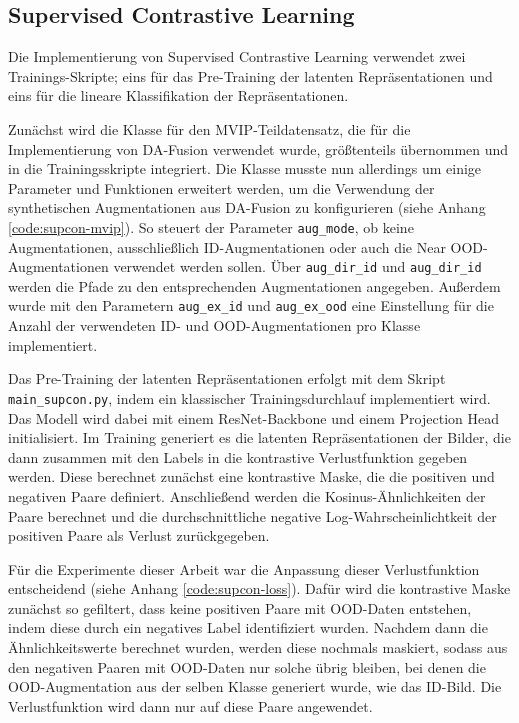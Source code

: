 \subsection{Supervised Contrastive Learning} \label{sec:supcon-implementation}

Die Implementierung von Supervised Contrastive Learning verwendet zwei Trainings-Skripte; eins für das Pre-Training der latenten Repräsentationen und eins für die lineare Klassifikation der Repräsentationen.

Zunächst wird die Klasse für den MVIP-Teildatensatz, die für die Implementierung von DA-Fusion verwendet wurde, größtenteils übernommen und in die Trainingsskripte integriert. Die Klasse musste nun allerdings um einige Parameter und Funktionen erweitert werden, um die Verwendung der synthetischen Augmentationen aus DA-Fusion zu konfigurieren (siehe Anhang \ref{code:supcon-mvip}). So steuert der Parameter \lstinline{aug_mode}, ob keine Augmentationen, ausschließlich ID-Augmentationen oder auch die Near OOD-Augmentationen verwendet werden sollen. Über \lstinline{aug_dir_id} und \lstinline{aug_dir_id} werden die Pfade zu den entsprechenden Augmentationen angegeben. Außerdem wurde mit den Parametern \lstinline{aug_ex_id} und \lstinline{aug_ex_ood} eine Einstellung für die Anzahl der verwendeten ID- und OOD-Augmentationen pro Klasse implementiert. %

Das Pre-Training der latenten Repräsentationen erfolgt mit dem Skript \lstinline{main_supcon.py}, indem ein klassischer Trainingsdurchlauf implementiert wird. Das Modell wird dabei mit einem ResNet-Backbone und einem Projection Head initialisiert. Im Training generiert es die latenten Repräsentationen der Bilder, die dann zusammen mit den Labels in die kontrastive Verlustfunktion gegeben werden. Diese berechnet zunächst eine kontrastive Maske, die die positiven und negativen Paare definiert. Anschließend werden die Kosinus-Ähnlichkeiten der Paare berechnet und die durchschnittliche negative Log-Wahrscheinlichtkeit der positiven Paare als Verlust zurückgegeben.

Für die Experimente dieser Arbeit war die Anpassung dieser Verlustfunktion entscheidend (siehe Anhang \ref{code:supcon-loss}). Dafür wird die kontrastive Maske zunächst so gefiltert, dass keine positiven Paare mit OOD-Daten entstehen, indem diese durch ein negatives Label identifiziert wurden. Nachdem dann die Ähnlichkeitswerte berechnet wurden, werden diese nochmals maskiert, sodass aus den negativen Paaren mit OOD-Daten nur solche übrig bleiben, bei denen die OOD-Augmentation aus der selben Klasse generiert wurde, wie das ID-Bild. Die Verlustfunktion wird dann nur auf diese Paare angewendet.

